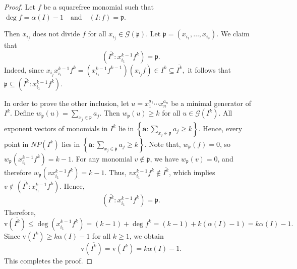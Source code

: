 \documentclass[10pt,a4paper]{amsart}
\begin{document}
\begin{proof}
Let \(f\) be a squarefree monomial such that
\(
\deg f = \alpha(I) - 1 \quad \text{and} \quad (I : f) = \mathfrak{p}.
\)

\noindent Then \(x_{i_j}\) does not divide \(f\) for all \(x_{i_j} \in \mathcal{G}(\mathfrak{p})\). Let \(\mathfrak{p} = (x_{i_1}, \ldots, x_{i_s})\).
\noindent We claim that
\[
(\overline{I^k} : x_{i_1}^{k-1} f^k) = \mathfrak{p}.
\]
Indeed, since
\(
x_{i_j} x_{i_1}^{k-1} f^k = (x_{i_1}^{k-1} f^{k-1})(x_{i_j} f) \in I^k \subseteq \overline{I^k},
\)
it follows that \(\mathfrak{p} \subseteq (\overline{I^k} : x_{i_1}^{k-1} f^k)\).

\noindent In order to prove the other inclusion, let \(u = x_1^{a_1} \cdots x_n^{a_n}\) be a minimal generator of \(I^k\). Define
\(
w_{\mathfrak{p}}(u) = {\sum_{x_j \in \mathfrak{p}}} a_j.
\)
Then \(w_{\mathfrak{p}}(u) \ge k\) for all \(u \in \mathcal{G}(I^k)\).
All exponent vectors of monomials in \(I^k\) lie in 
\(
\left\{ \mathbf{a} : \sum_{x_j \in \mathfrak{p}} a_j \ge k \right\}.
\)
Hence, every point in \(NP(I^k)\) lies in
\(
\left\{ \mathbf{a} : \sum_{x_j \in \mathfrak{p}} a_j \ge k \right\}.
\)
Note that, \(w_{\mathfrak{p}}(f) = 0\), so
\(
w_{\mathfrak{p}}(x_{i_1}^{k-1} f^k) = k - 1.
\)
For any monomial \(v \notin \mathfrak{p}\), we have \(w_{\mathfrak{p}}(v) = 0\), and therefore
\(
w_{\mathfrak{p}}(v x_{i_1}^{k-1} f^k) = k - 1.
\)
Thus, \(v x_{i_1}^{k-1} f^k \notin \overline{I^k}\), which implies
\(
v \notin (\overline{I^k} : x_{i_1}^{k-1} f^k).
\)
Hence,
\[
(\overline{I^k} : x_{i_1}^{k-1} f^k) = \mathfrak{p}.
\]
Therefore,
\[
\mathrm{v}(\overline{I^k}) \le \deg(x_{i_1}^{k-1} f^k) = (k-1) + \deg f^k = (k-1) + k(\alpha(I) - 1) = k\alpha(I) - 1.
\]
Since \(\mathrm{v}(I^k) \ge k\alpha(I) - 1\) for all \(k \ge 1\), we obtain
\[
\mathrm{v}(\overline{I^k}) = \mathrm{v}(I^k) = k\alpha(I) - 1.
\]
This completes the proof.
\end{proof}
\end{document}
